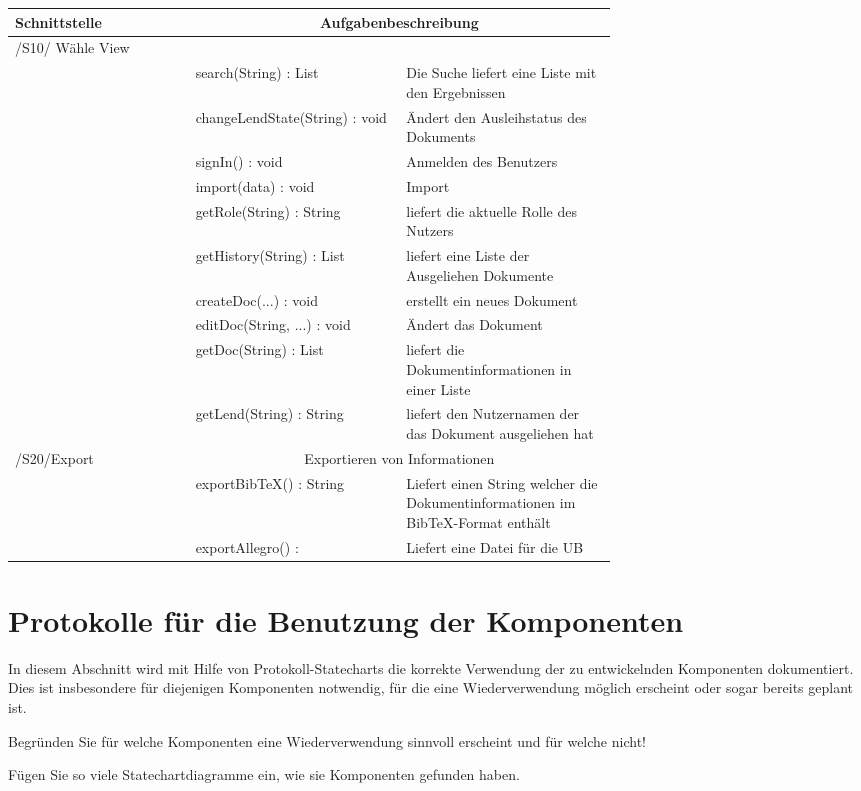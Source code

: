 \begin{tabular}[ht]{|l|p{0.35\linewidth}|p{0.35\linewidth}|}
\hline
Schnittstelle & \multicolumn{2}{|c|}{Aufgabenbeschreibung}\\
\hline
\hline
/S10/ Wähle View & \multicolumn{2}{|c|}{}\\
\hline
& search(String) : List & Die Suche liefert eine Liste mit den Ergebnissen\\
& changeLendState(String) : void & Ändert den Ausleihstatus des Dokuments\\
& signIn() : void & Anmelden des Benutzers\\
& import(data) : void & Import \\
& getRole(String) : String & liefert die aktuelle Rolle des Nutzers\\
& getHistory(String) : List & liefert eine Liste der Ausgeliehen Dokumente\\
& createDoc(...) : void & erstellt ein neues Dokument\\
& editDoc(String, ...) : void & Ändert das Dokument \\
& getDoc(String) : List & liefert die Dokumentinformationen in einer Liste\\
& getLend(String) : String & liefert den Nutzernamen der das Dokument ausgeliehen hat\\
\hline
/S20/Export & \multicolumn{2}{|c|}{Exportieren von Informationen}\\
\hline
& exportBibTeX() : String & Liefert einen String welcher die Dokumentinformationen im BibTeX-Format enthält\\
& exportAllegro() : & Liefert eine Datei für die UB\\
\hline
\end{tabular}





\section{Protokolle für die Benutzung der Komponenten}

In diesem Abschnitt wird mit Hilfe von Protokoll-Statecharts die korrekte
Verwendung der zu entwickelnden Komponenten dokumentiert. Dies ist insbesondere
für diejenigen Komponenten notwendig, für die eine Wiederverwendung möglich
erscheint oder sogar bereits geplant ist.

Begründen Sie für welche Komponenten eine Wiederverwendung sinnvoll erscheint
und für welche nicht!

Fügen Sie so viele Statechartdiagramme ein, wie sie Komponenten gefunden haben.
